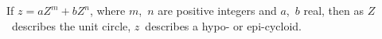 If $z = aZ^{m} + bZ^{n}$, where $m$,~$n$ are positive integers and $a$,~$b$ real, then
as $Z$~describes the unit circle, $z$~describes a hypo- or epi-cycloid.

